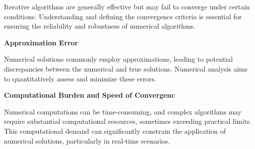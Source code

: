 Iterative algorithms are generally effective but may fail to converge under certain conditions. Understanding and defining the convergence criteria is essential for ensuring the reliability and robustness of numerical algorithms.

\vspace{0.1in}
\noindent \textbf{Approximation Error}
\vspace{0.1in}

Numerical solutions commonly employ approximations, leading to potential discrepancies between the numerical and true solutions. Numerical analysis aims to quantitatively assess and minimize these errors.

\vspace{0.1in}
\noindent \textbf{Computational Burden and Speed of Convergenc}
\vspace{0.1in}

Numerical computations can be time-consuming, and complex algorithms may require substantial computational resources, sometimes exceeding practical limits. This computational demand can significantly constrain the application of numerical solutions, particularly in real-time scenarios.


